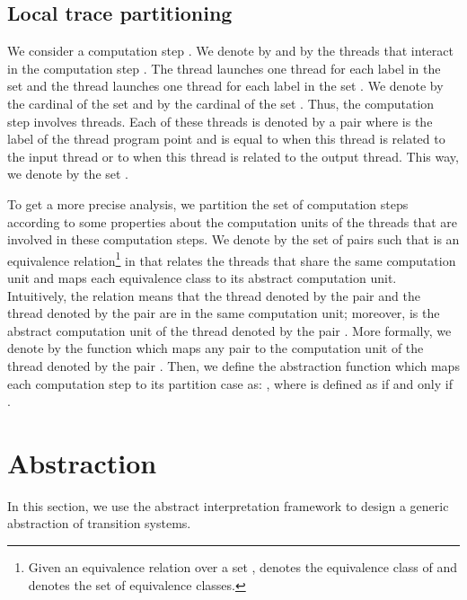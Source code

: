 \documentclass{article}
\newcommand{\rec}{?}
\newcommand{\eme}{!}
\newcommand{\lrec}{l_{\rec}}
\newcommand{\leme}{l_{\eme}}
\begin{document}
\subsection{Local trace partitioning}
\newcommand{\vartrans}{\mathcal{T}(\lrec,\leme)}
We consider a computation step . We denote by  and by  the threads that interact in the computation step . 
The thread  launches one thread for each label   in the set  and the thread  launches  one thread for each label  in the set . We denote by  the cardinal of the set  and by  the cardinal of the set . 
Thus, the computation step  involves  threads. 
Each of these threads is denoted by a pair  where  is the label of the thread program point and  is equal to  when this thread is related to the input  thread or to  when this thread is related to the output thread. This way, we denote by 
 the set . 
\newcommand{\abstractcontext}{\textsc{context}}
\newcommand{\classes}{(\vartrans)_{\sim}}
\newcommand{\classede}[1]{[#1]_{\sim}}

To get a more precise analysis, 
we partition the set of computation steps according to some properties about the computation units of the threads that are involved in these computation steps.
We denote by  the set of pairs  such that  is an equivalence relation\footnote{Given an equivalence relation  over a set ,  denotes the equivalence class  of   and  denotes the set  of equivalence classes.}  in  that relates the threads that share the same computation unit  and  maps each equivalence class to its abstract computation unit.
Intuitively, the relation  means that the thread denoted by the pair  and the thread denoted by the pair  are in the same computation unit; moreover,  is the abstract computation unit of the thread denoted by the pair . 
More formally, we denote by  the function which maps any pair  to the computation unit of the thread denoted by the pair .
Then, we define the abstraction function  which  maps each computation step to its partition case as: 
, 
where  is defined as  if and only if .



\section{Abstraction}
\label{ai}
In this section, we use the abstract interpretation framework \cite{c:thesis,cc:popl77} to design a generic abstraction of transition systems. 
\end{document}

